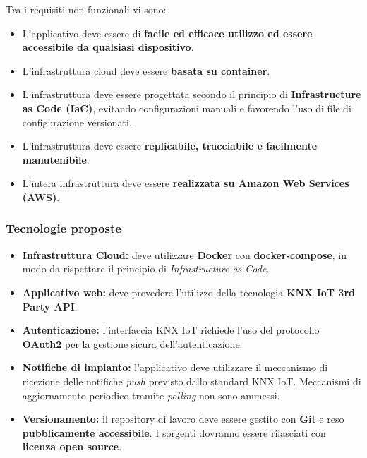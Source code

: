 \documentclass[a4paper,11pt]{article}
\begin{document}
Tra i requisiti non funzionali vi sono:
\begin{itemize}
    \item L'applicativo deve essere di \textbf{facile ed efficace utilizzo ed essere accessibile da qualsiasi dispositivo}.
    \item L'infrastruttura cloud deve essere \textbf{basata su container}.
    \item L'infrastruttura deve essere progettata secondo il principio di \textbf{Infrastructure as Code (IaC)}, evitando configurazioni manuali e favorendo l'uso di file di configurazione versionati.
    \item L'infrastruttura deve essere \textbf{replicabile, tracciabile e facilmente manutenibile}.
    \item L'intera infrastruttura deve essere \textbf{realizzata su Amazon Web Services (AWS)}.
\end{itemize}

\subsubsection{Tecnologie proposte}
\begin{itemize}
  \item \textbf{Infrastruttura Cloud:} deve utilizzare \textbf{Docker} con \textbf{docker-compose}, in modo da rispettare il principio di \textit{Infrastructure as Code}.
  \item \textbf{Applicativo web:} deve prevedere l'utilizzo della tecnologia \textbf{KNX IoT 3rd Party API}.
  \item \textbf{Autenticazione:} l'interfaccia KNX IoT richiede l'uso del protocollo \textbf{OAuth2} per la gestione sicura dell'autenticazione.
  \item \textbf{Notifiche di impianto:} l'applicativo deve utilizzare il meccanismo di ricezione delle notifiche \textit{push} previsto dallo standard KNX IoT.  
  Meccanismi di aggiornamento periodico tramite \textit{polling} non sono ammessi.
  \item \textbf{Versionamento:} il repository di lavoro deve essere gestito con \textbf{Git} e reso \textbf{pubblicamente accessibile}.  
  I sorgenti dovranno essere rilasciati con \textbf{licenza open source}.
\end{itemize}
\end{document}
